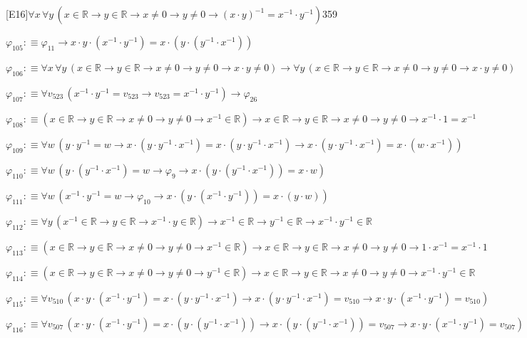 \begin{fullproof}{[E16]}{$\forall x\,\forall y\,(x \in \mathbb{R} \to y \in \mathbb{R} \to x \neq 0 \to y \neq 0 \to (x \cdot y)^{-1} = x^{-1} \cdot y^{-1})$}{359}
\begin{abbrevlist}
\item $\varphi_{105} :\equiv \varphi_{11} \to x \cdot y \cdot (x^{-1} \cdot y^{-1}) = x \cdot (y \cdot (y^{-1} \cdot x^{-1}))$
\item $\varphi_{106} :\equiv \forall x\,\forall y\,(x \in \mathbb{R} \to y \in \mathbb{R} \to x \neq 0 \to y \neq 0 \to x \cdot y \neq 0) \to \forall y\,(x \in \mathbb{R} \to y \in \mathbb{R} \to x \neq 0 \to y \neq 0 \to x \cdot y \neq 0)$
\item $\varphi_{107} :\equiv \forall v_{523}\,(x^{-1} \cdot y^{-1} = v_{523} \to v_{523} = x^{-1} \cdot y^{-1}) \to \varphi_{26}$
\item $\varphi_{108} :\equiv (x \in \mathbb{R} \to y \in \mathbb{R} \to x \neq 0 \to y \neq 0 \to x^{-1} \in \mathbb{R}) \to x \in \mathbb{R} \to y \in \mathbb{R} \to x \neq 0 \to y \neq 0 \to x^{-1} \cdot 1 = x^{-1}$
\item $\varphi_{109} :\equiv \forall w\,(y \cdot y^{-1} = w \to x \cdot (y \cdot y^{-1} \cdot x^{-1}) = x \cdot (y \cdot y^{-1} \cdot x^{-1}) \to x \cdot (y \cdot y^{-1} \cdot x^{-1}) = x \cdot (w \cdot x^{-1}))$
\item $\varphi_{110} :\equiv \forall w\,(y \cdot (y^{-1} \cdot x^{-1}) = w \to \varphi_{9} \to x \cdot (y \cdot (y^{-1} \cdot x^{-1})) = x \cdot w)$
\item $\varphi_{111} :\equiv \forall w\,(x^{-1} \cdot y^{-1} = w \to \varphi_{10} \to x \cdot (y \cdot (x^{-1} \cdot y^{-1})) = x \cdot (y \cdot w))$
\item $\varphi_{112} :\equiv \forall y\,(x^{-1} \in \mathbb{R} \to y \in \mathbb{R} \to x^{-1} \cdot y \in \mathbb{R}) \to x^{-1} \in \mathbb{R} \to y^{-1} \in \mathbb{R} \to x^{-1} \cdot y^{-1} \in \mathbb{R}$
\item $\varphi_{113} :\equiv (x \in \mathbb{R} \to y \in \mathbb{R} \to x \neq 0 \to y \neq 0 \to x^{-1} \in \mathbb{R}) \to x \in \mathbb{R} \to y \in \mathbb{R} \to x \neq 0 \to y \neq 0 \to 1 \cdot x^{-1} = x^{-1} \cdot 1$
\item $\varphi_{114} :\equiv (x \in \mathbb{R} \to y \in \mathbb{R} \to x \neq 0 \to y \neq 0 \to y^{-1} \in \mathbb{R}) \to x \in \mathbb{R} \to y \in \mathbb{R} \to x \neq 0 \to y \neq 0 \to x^{-1} \cdot y^{-1} \in \mathbb{R}$
\item $\varphi_{115} :\equiv \forall v_{510}\,(x \cdot y \cdot (x^{-1} \cdot y^{-1}) = x \cdot (y \cdot y^{-1} \cdot x^{-1}) \to x \cdot (y \cdot y^{-1} \cdot x^{-1}) = v_{510} \to x \cdot y \cdot (x^{-1} \cdot y^{-1}) = v_{510})$
\item $\varphi_{116} :\equiv \forall v_{507}\,(x \cdot y \cdot (x^{-1} \cdot y^{-1}) = x \cdot (y \cdot (y^{-1} \cdot x^{-1})) \to x \cdot (y \cdot (y^{-1} \cdot x^{-1})) = v_{507} \to x \cdot y \cdot (x^{-1} \cdot y^{-1}) = v_{507})$

\end{abbrevlist}
\end{fullproof}
